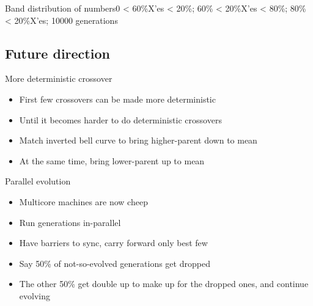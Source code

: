 \documentclass{beamer}
\begin{document}
\begin{frame}{Band distribution of numbers}{0 < 60\%X'es < 20\%; 60\% < 20\%X'es < 80\%; 80\% < 20\%X'es; 10000 generations}
  \begin{centering}
  \end{centering}
\end{frame}

\subsection{Future direction}

\begin{frame}{More deterministic crossover}
  \begin{centering}
    \begin{itemize}
      \item First few crossovers can be made more deterministic
        \pause
      \item Until it becomes harder to do deterministic crossovers
        \pause
      \item Match inverted bell curve to bring higher-parent down to mean
        \pause
      \item At the same time, bring lower-parent up to mean
    \end{itemize}
  \end{centering}
\end{frame}

\begin{frame}{Parallel evolution}
  \begin{centering}
    \begin{itemize}
    \item Multicore machines are now cheep
      \pause
    \item Run generations in-parallel
      \pause
    \item Have barriers to sync, carry forward only best few
      \pause
    \item Say 50\% of not-so-evolved generations get dropped
      \pause
    \item The other 50\% get double up to make up for the dropped ones, and continue evolving
    \end{itemize}
  \end{centering}
\end{frame}
\end{document}
